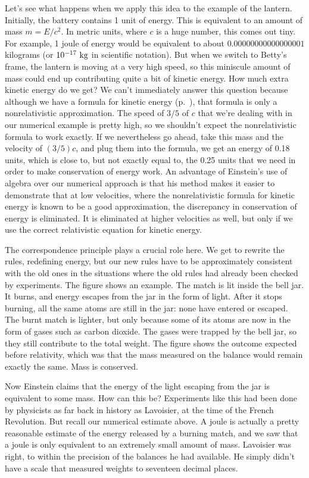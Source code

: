 Let's see what happens when we apply this idea to the example of the lantern. Initially, the battery contains
1 unit of energy. This is equivalent to an amount of mass $m=E/c^2$. In metric units, where $c$ is a huge number,
this comes out tiny. For example, 1 joule of energy would be equivalent to about $0.00000000000000001$ kilograms (or
$10^{-17}\ \textup{kg}$ in scientific notation). But when we switch to Betty's frame, the lantern is moving at a
very high speed, so this miniscule amount of mass could end up contributing quite a bit of kinetic energy.
How much extra kinetic energy do we get? We can't immediately answer this question because although we have
a formula for kinetic energy (p.~\pageref{ke-formula}), that formula is only a nonrelativistic approximation.
The speed of $3/5$ of $c$ that we're dealing with in our numerical example is pretty high, so we shouldn't
expect the nonrelativistic formula to work exactly. 
If we nevertheless go ahead, take this mass and the velocity of $(3/5)c$, and plug them
into the formula, we get an energy of 0.18 units, which is close to, but not exactly equal to, the 0.25
units that we need in order to make conservation of energy work. An advantage of Einstein's use of algebra
over our numerical approach is that his method makes it easier to demonstrate that at low velocities, where
the nonrelativistic formula for kinetic energy is known to be a good approximation, the discrepancy in
conservation of energy is eliminated. It is eliminated at higher velocities as well, but only if we use
the correct relativistic equation for kinetic energy.


The correspondence principle plays a crucial role here. We get to rewrite the rules, redefining
energy, but our new rules have to be approximately consistent with the old ones in the situations where the old
rules had already been checked by experiments. The figure shows an example.
The match is lit inside the bell jar. It burns, and energy escapes from the jar
in the form of light. After it stops burning, all the same atoms are still in the
jar: none have entered or escaped. The burnt match is lighter, but only because some of its
atoms are now in the form of gases such as carbon dioxide. The gases were trapped by the bell jar,
so they still contribute to the total weight. The figure shows the outcome expected before
relativity, which was that the mass measured on the balance would remain exactly the same.
Mass is conserved.

Now Einstein claims that the energy of the light escaping from the jar is equivalent to some mass.
How can this be? Experiments like this had been done by physicists as far back in history as Lavoisier, at the time of
the French Revolution. But recall our numerical estimate above. A joule is actually a pretty reasonable
estimate of the energy released by a burning match, and we saw that a joule is only equivalent to an
extremely small amount of mass. Lavoisier was right, to within the precision of the balances he had available.
He simply didn't have a scale that measured weights to seventeen decimal places.
